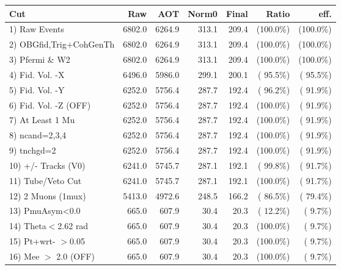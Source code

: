  \begin{table}[h!]\centering
 \begin{tabular}{||l||r|r|r|r|r|r||}
 \hline
 \hline
 Cut & Raw & AOT & Norm0 & Final & Ratio & eff.       \\
 \hline
  1) Raw Events           &       6802.0 &       6264.9 &        313.1 &        209.4 & (100.0\%) & (100.0\%) \\
  2) OBGfid,Trig+CohGenTh &       6802.0 &       6264.9 &        313.1 &        209.4 & (100.0\%) & (100.0\%) \\
  3) Pfermi \& W2         &       6802.0 &       6264.9 &        313.1 &        209.4 & (100.0\%) & (100.0\%) \\
  4) Fid. Vol. -X         &       6496.0 &       5986.0 &        299.1 &        200.1 & ( 95.5\%) & ( 95.5\%) \\
  5) Fid. Vol. -Y         &       6252.0 &       5756.4 &        287.7 &        192.4 & ( 96.2\%) & ( 91.9\%) \\
  6) Fid. Vol. -Z (OFF)   &       6252.0 &       5756.4 &        287.7 &        192.4 & (100.0\%) & ( 91.9\%) \\
  7) At Least 1 Mu        &       6252.0 &       5756.4 &        287.7 &        192.4 & (100.0\%) & ( 91.9\%) \\
  8) ncand=2,3,4          &       6252.0 &       5756.4 &        287.7 &        192.4 & (100.0\%) & ( 91.9\%) \\
  9) tnchgd=2             &       6252.0 &       5756.4 &        287.7 &        192.4 & (100.0\%) & ( 91.9\%) \\
 10) +/- Tracks (V0)      &       6241.0 &       5745.7 &        287.1 &        192.1 & ( 99.8\%) & ( 91.7\%) \\
 11) Tube/Veto Cut        &       6241.0 &       5745.7 &        287.1 &        192.1 & (100.0\%) & ( 91.7\%) \\
 12) 2 Muons (1mux)       &       5413.0 &       4972.6 &        248.5 &        166.2 & ( 86.5\%) & ( 79.4\%) \\
 13) PmuAsym<0.0          &        665.0 &        607.9 &         30.4 &         20.3 & ( 12.2\%) & (  9.7\%) \\
 14) Theta$<$2.62 rad     &        665.0 &        607.9 &         30.4 &         20.3 & (100.0\%) & (  9.7\%) \\
 15) Pt+wrt- $>$0.05      &        665.0 &        607.9 &         30.4 &         20.3 & (100.0\%) & (  9.7\%) \\
 16) Mee $>$ 2.0  (OFF)   &        665.0 &        607.9 &         30.4 &         20.3 & (100.0\%) & (  9.7\%) \\

\end{tabular}
\end{table}

